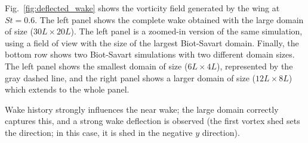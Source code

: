 \documentclass[preprint,12pt]{elsarticle}
\begin{document}
Fig.~\ref{fig:deflected_wake} shows the vorticity field generated by the wing at $St=0.6$. The left panel shows the complete wake obtained with the large domain of size ($30L\times20L$). The left panel is a zoomed-in version of the same simulation, using a field of view with the size of the largest Biot-Savart domain. Finally, the bottom row shows two Biot-Savart simulations with two different domain sizes. The left panel shows the smallest domain of size ($6L\times4L$), represented by the gray dashed line, and the right panel shows a larger domain of size ($12L\times8L$) which extends to the whole panel.

Wake history strongly influences the near wake; the large domain correctly captures this, and a strong wake deflection is observed (the first vortex shed sets the direction; in this case, it is shed in the negative $y$ direction).
\end{document}

